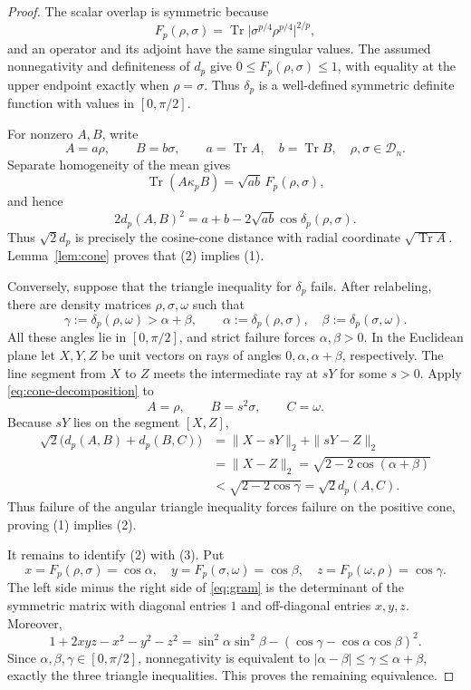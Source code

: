 \documentclass[11pt]{article}
\newcommand{\Tr}{\operatorname{Tr}}
\begin{document}
\begin{proof}
The scalar overlap is symmetric because
\[
 F_p(\rho,\sigma)
 =\Tr\bigl|\sigma^{p/4}\rho^{p/4}\bigr|^{2/p},
\]
and an operator and its adjoint have the same singular values.  The assumed
nonnegativity and definiteness of $d_p$ give
$0\leq F_p(\rho,\sigma)\leq1$, with equality at the upper endpoint exactly
when $\rho=\sigma$.  Thus $\delta_p$ is a well-defined symmetric definite
function with values in $[0,\pi/2]$.

For nonzero $A,B$, write
\[
 A=a\rho,\qquad B=b\sigma,\qquad
 a=\Tr A,\quad b=\Tr B,\quad \rho,\sigma\in\mathcal D_n.
\]
Separate homogeneity of the mean gives
\[
 \Tr(A\mathbin{\kappa_p}B)=\sqrt{ab}\,F_p(\rho,\sigma),
\]
and hence
\begin{equation}\label{eq:cone-decomposition}
 2d_p(A,B)^2
 =a+b-2\sqrt{ab}\cos\delta_p(\rho,\sigma).
\end{equation}
Thus $\sqrt2d_p$ is precisely the cosine-cone distance with radial coordinate
$\sqrt{\Tr A}$.  Lemma~\ref{lem:cone} proves that (2) implies (1).

Conversely, suppose that the triangle inequality for $\delta_p$ fails.  After
relabeling, there are density matrices $\rho,\sigma,\omega$ such that
\[
 \gamma:=\delta_p(\rho,\omega)
 >\alpha+\beta,\qquad
 \alpha:=\delta_p(\rho,\sigma),\quad
 \beta:=\delta_p(\sigma,\omega).
\]
All these angles lie in $[0,\pi/2]$, and strict failure forces
$\alpha,\beta>0$.  In the Euclidean plane let $X,Y,Z$ be unit vectors on rays
of angles $0,\alpha,\alpha+\beta$, respectively.  The line segment from $X$
to $Z$ meets the intermediate ray at $sY$ for some $s>0$.  Apply
\eqref{eq:cone-decomposition} to
\[
 A=\rho,\qquad B=s^2\sigma,\qquad C=\omega.
\]
Because $sY$ lies on the segment $[X,Z]$,
\begin{align*}
 \sqrt2\bigl(d_p(A,B)+d_p(B,C)\bigr)
 &=\|X-sY\|_2+\|sY-Z\|_2\\
 &=\|X-Z\|_2
 =\sqrt{2-2\cos(\alpha+\beta)}\\
 &<\sqrt{2-2\cos\gamma}
 =\sqrt2d_p(A,C).
\end{align*}
Thus failure of the angular triangle inequality forces failure on the positive
cone, proving (1) implies (2).

It remains to identify (2) with (3).  Put
\[
 x=F_p(\rho,\sigma)=\cos\alpha,\quad
 y=F_p(\sigma,\omega)=\cos\beta,\quad
 z=F_p(\omega,\rho)=\cos\gamma.
\]
The left side minus the right side of \eqref{eq:gram} is the determinant of
the symmetric matrix with diagonal entries $1$ and off-diagonal entries
$x,y,z$.  Moreover,
\[
 1+2xyz-x^2-y^2-z^2
 =\sin^2\alpha\sin^2\beta
  -(\cos\gamma-\cos\alpha\cos\beta)^2.
\]
Since $\alpha,\beta,\gamma\in[0,\pi/2]$, nonnegativity is equivalent to
$|\alpha-\beta|\leq\gamma\leq\alpha+\beta$, exactly the three triangle
inequalities.  This proves the remaining equivalence.
\end{proof}
\end{document}
